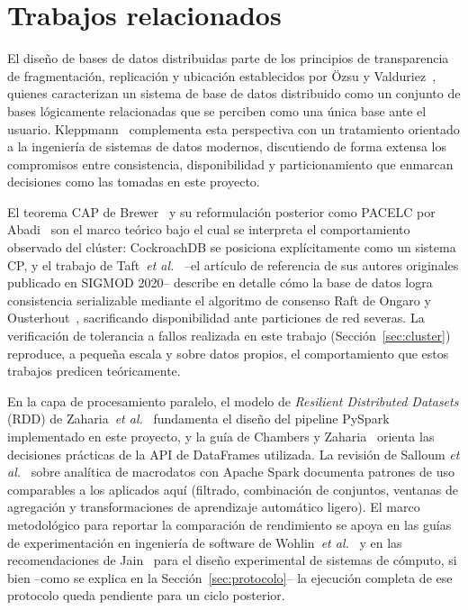 \documentclass[10pt,twocolumn]{article}
\begin{document}
\section{Trabajos relacionados}
\label{sec:relacionados}

El diseño de bases de datos distribuidas parte de los principios de
transparencia de fragmentación, replicación y ubicación establecidos por
Özsu y Valduriez~\cite{ozsu2020}, quienes caracterizan un sistema de base de
datos distribuido como un conjunto de bases lógicamente relacionadas que se
perciben como una única base ante el usuario. Kleppmann~\cite{kleppmann2022}
complementa esta perspectiva con un tratamiento orientado a la ingeniería de
sistemas de datos modernos, discutiendo de forma extensa los compromisos
entre consistencia, disponibilidad y particionamiento que enmarcan
decisiones como las tomadas en este proyecto.

El teorema CAP de Brewer~\cite{lee2023cap} y su reformulación posterior como
PACELC por Abadi~\cite{lee2023cap} son el marco teórico bajo el cual se
interpreta el comportamiento observado del clúster: CockroachDB se posiciona
explícitamente como un sistema CP, y el trabajo de
Taft~\emph{et al.}~\cite{taft2020} --el artículo de referencia de sus
autores originales publicado en SIGMOD 2020-- describe en detalle cómo la
base de datos logra consistencia serializable mediante el algoritmo de
consenso Raft de Ongaro y Ousterhout~\cite{huang2020tidb}, sacrificando
disponibilidad ante particiones de red severas. La verificación de
tolerancia a fallos realizada en este trabajo (Sección~\ref{sec:cluster})
reproduce, a pequeña escala y sobre datos propios, el comportamiento que
estos trabajos predicen teóricamente.

En la capa de procesamiento paralelo, el modelo de \emph{Resilient
Distributed Datasets} (RDD) de Zaharia~\emph{et al.}~\cite{wang2022spark}
fundamenta el diseño del pipeline PySpark implementado en este proyecto, y
la guía de Chambers y Zaharia~\cite{wang2022spark} orienta las decisiones
prácticas de la API de DataFrames utilizada. La revisión de Salloum
\emph{et al.}~\cite{wang2022spark} sobre analítica de macrodatos con Apache
Spark documenta patrones de uso comparables a los aplicados aquí (filtrado,
combinación de conjuntos, ventanas de agregación y transformaciones de
aprendizaje automático ligero). El marco metodológico para reportar la
comparación de rendimiento se apoya en las guías de experimentación en
ingeniería de software de Wohlin~\emph{et al.}~\cite{verdecchia2023} y en las
recomendaciones de Jain~\cite{baltes2022sampling} para el diseño experimental de
sistemas de cómputo, si bien --como se explica en la
Sección~\ref{sec:protocolo}-- la ejecución completa de ese protocolo queda
pendiente para un ciclo posterior.
\end{document}
